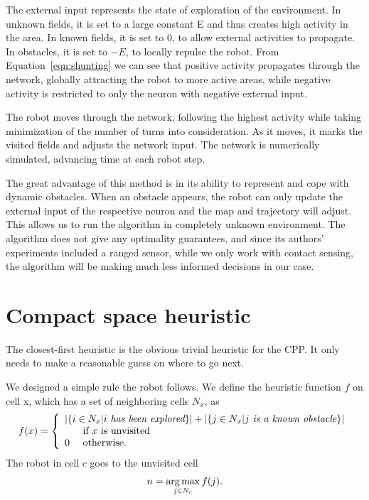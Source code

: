 \documentclass[buriama8_dp.tex]{subfiles}
\begin{document}
The external input represents the state of exploration of the environment. In unknown fields, it is set to a large constant \m E and thus creates high activity in the area. In known fields, it is set to 0, to allow external activities to propagate. In obstacles, it is set to \(-E\), to locally repulse the robot. From Equation~\ref{eqn:shunting} we can see that positive activity propagates through the network, globally attracting the robot to more active areas, while negative activity is restricted to only the neuron with negative external input.

The robot moves through the network, following the highest activity while taking minimization of the number of turns into consideration. As it moves, it marks the visited fields and adjusts the network input. The network is numerically simulated, advancing time at each robot step.

The great advantage of this method is in its ability to represent and cope with dynamic obstacles. When an obstacle appears, the robot can only update the external input of the respective neuron and the map and trajectory will adjust. This allows us to run the algorithm in completely unknown environment. The algorithm does not give any optimality guarantees, and since its authors' experiments included a ranged sensor, while we only work with contact sensing, the algorithm will be making much less informed decisions in our case.

\section{Compact space heuristic}
\label{sec:my_heuristic}

The closest-first heuristic is the obvious trivial heuristic for the CPP. It only needs to make a reasonable guess on where to go next. 

We designed a simple rule the robot follows. We define the heuristic function \(f\) on cell \m x, which has a set of neighboring cells \(N_x\), as 
\begin{equation}
f(x)= \left\{
    \begin{array}{l}
      |\{i \in N_x | i \textit{ has been explored}\}| + |\{j \in N_x | j \textit{ is a known obstacle}\}| \\
      \hphantom{0} \quad \textrm{ if }x\textrm{ is unvisited} \\
      0 \quad \textrm{ otherwise.}
    \end{array}
    \right.
    \label{eq:heuristic}
\end{equation}
The robot in cell \(c\) goes to the unvisited cell
\[n = \operatorname*{arg\,max}_{j \in N_c} f(j).\]
\end{document}
